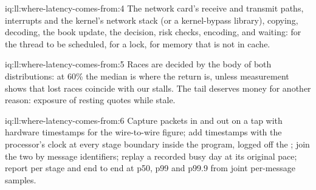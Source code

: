 \begin{solution}{iq:ll:where-latency-comes-from:4}
The network card's receive and transmit paths, interrupts and the kernel's network stack (or a kernel-bypass
library), copying, decoding, the book update, the decision, risk checks, encoding, and waiting: for the thread to be
scheduled, for a lock, for memory that is not in cache.
\end{solution}

\begin{solution}{iq:ll:where-latency-comes-from:5}
Races are decided by the body of both distributions: at 60\% the median is where the return is, unless measurement
shows that lost races coincide with our stalls. The tail deserves money for another reason: exposure of resting quotes
while stale.
\end{solution}

\begin{solution}{iq:ll:where-latency-comes-from:6}
Capture packets in and out on a tap with hardware timestamps for the wire-to-wire figure; add timestamps with the
processor's clock at every stage boundary inside the program, logged off the ; join the two by message
identifiers; replay a recorded busy day at its original pace; report per stage and end to end at p50, p99 and p99.9
from joint per-message samples.
\end{solution}
